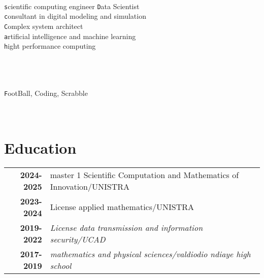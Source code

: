 \documentclass[lighthipster]{simplehipstercv}
\begin{document}
\begin{paracol}{2}
{\begin{flushleft}
\bigskip

\\[0.3em]

\texttt scientific computing engineer
\texttt Data Scientist\\
\texttt consultant in digital modeling and simulation\\
\texttt Complex system architect\\
\texttt artificial intelligence and machine learning\\
\texttt hight performance computing\\

\vspace{1em}
\\
\\
\bigskip

 \\[0.5em]
\texttt FootBall, Coding, Scrabble

\end{flushleft}
\phantom{turn the page}

}

\switchcolumn

\small
\section{}

\begin{tabular}{r| p{} c}
   
\end{tabular}
\vspace{1em}

\begin{minipage}[t]{0.35\textwidth}
\section*{Education}
\begin{tabular}{>{\footnotesize\bfseries}r >{\footnotesize}p{}}
    2024-2025 & master 1 Scientific Computation and Mathematics of Innovation/UNISTRA\\
    2023-2024 & License applied mathematics/UNISTRA\\
    2019-2022 & \emph{License data transmission and information security/UCAD} \\
    2017-2019 & \emph{mathematics and physical sciences/valdiodio ndiaye high school} \\
\end{tabular}
\end{minipage}\hfill
\begin{minipage}[t]{0.3\textwidth}
\begin{flushleft}

\end{flushleft}
\end{minipage}
\end{paracol}
\end{document}
